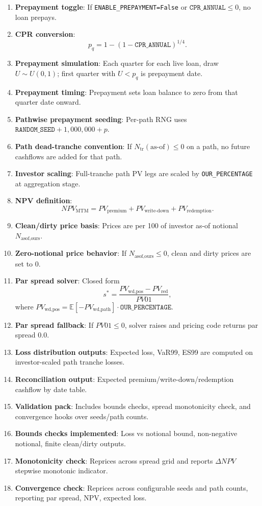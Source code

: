 \documentclass[11pt]{article}
\begin{document}
\begin{enumerate}[label=\arabic*),leftmargin=*,align=left]
\item \textbf{Prepayment toggle}: If \texttt{ENABLE\_PREPAYMENT=False} or \(\texttt{CPR\_ANNUAL}\le 0\), no loan prepays.
\item \textbf{CPR conversion}: 
\[
p_q=1-(1-\texttt{CPR\_ANNUAL})^{1/4}.
\]
\item \textbf{Prepayment simulation}: Each quarter for each live loan, draw \(U\sim U(0,1)\); first quarter with \(U<p_q\) is prepayment date.
\item \textbf{Prepayment timing}: Prepayment sets loan balance to zero from that quarter date onward.
\item \textbf{Pathwise prepayment seeding}: Per-path RNG uses \(\texttt{RANDOM\_SEED}+1{,}000{,}000+p\).

\item \textbf{Path dead-tranche convention}: If \(N_{\text{tr}}(\text{as-of})\le 0\) on a path, no future cashflows are added for that path.
\item \textbf{Investor scaling}: Full-tranche path PV legs are scaled by \texttt{OUR\_PERCENTAGE} at aggregation stage.
\item \textbf{NPV definition}:
\[
NPV_{\text{MTM}}=PV_{\text{premium}}+PV_{\text{write-down}}+PV_{\text{redemption}}.
\]
\item \textbf{Clean/dirty price basis}: Prices are per 100 of investor as-of notional \(N_{\text{asof,ours}}\).
\item \textbf{Zero-notional price behavior}: If \(N_{\text{asof,ours}}\le 0\), clean and dirty prices are set to 0.
\item \textbf{Par spread solver}: Closed form
\[
s^*=\frac{PV_{\text{wd,pos}}-PV_{\text{red}}}{PV01},
\]
where \(PV_{\text{wd,pos}}=\mathbb{E}[-PV_{\text{wd,path}}]\cdot \texttt{OUR\_PERCENTAGE}\).
\item \textbf{Par spread fallback}: If \(PV01\le 0\), solver raises and pricing code returns par spread \(0.0\).
\item \textbf{Loss distribution outputs}: Expected loss, VaR99, ES99 are computed on investor-scaled path tranche losses.
\item \textbf{Reconciliation output}: Expected premium/write-down/redemption cashflow by date table.

\item \textbf{Validation pack}: Includes bounds checks, spread monotonicity check, and convergence hooks over seeds/path counts.
\item \textbf{Bounds checks implemented}: Loss vs notional bound, non-negative notional, finite clean/dirty outputs.
\item \textbf{Monotonicity check}: Reprices across spread grid and reports \(\Delta NPV\) stepwise monotonic indicator.
\item \textbf{Convergence check}: Reprices across configurable seeds and path counts, reporting par spread, NPV, expected loss.


\end{enumerate}
\end{document}
